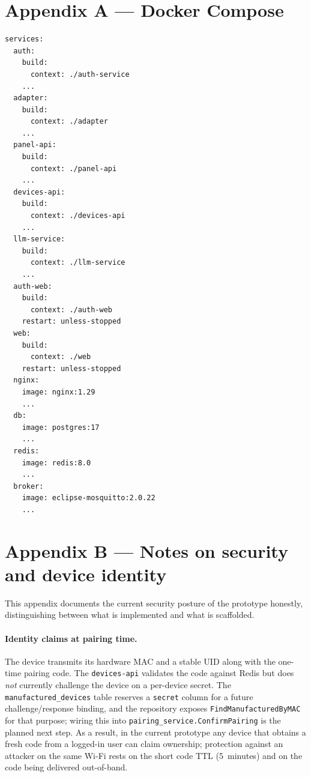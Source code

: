 \documentclass[a4paper,12pt]{article}
\begin{document}
\section*{Appendix A --- Docker Compose}

\begin{lstlisting}[caption={Abbreviated docker-compose.yml}]
services:
  auth:
    build:
      context: ./auth-service
    ...
  adapter:
    build:
      context: ./adapter
    ...
  panel-api:
    build:
      context: ./panel-api
    ...
  devices-api:
    build:
      context: ./devices-api
    ...
  llm-service:
    build:
      context: ./llm-service
    ...
  auth-web:
    build:
      context: ./auth-web
    restart: unless-stopped
  web:
    build:
      context: ./web
    restart: unless-stopped
  nginx:
    image: nginx:1.29
    ...
  db:
    image: postgres:17
    ...
  redis:
    image: redis:8.0
    ...
  broker:
    image: eclipse-mosquitto:2.0.22
    ...
\end{lstlisting}

\newpage

\section*{Appendix B --- Notes on security and device identity}

This appendix documents the current security posture of the prototype honestly, distinguishing between what is implemented and what is scaffolded.

\paragraph{Identity claims at pairing time.} The device transmits its hardware MAC and a stable UID along with the one-time pairing code. The \verb|devices-api| validates the code against Redis but does \emph{not} currently challenge the device on a per-device secret. The \verb|manufactured_devices| table reserves a \verb|secret| column for a future challenge/response binding, and the repository exposes \verb|FindManufacturedByMAC| for that purpose; wiring this into \verb|pairing_service.ConfirmPairing| is the planned next step. As a result, in the current prototype any device that obtains a fresh code from a logged-in user can claim ownership; protection against an attacker on the same Wi-Fi rests on the short code TTL (5~minutes) and on the code being delivered out-of-band.
\end{document}
